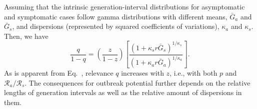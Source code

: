 \DIFaddbegin {}\DIFaddend Assuming that the intrinsic generation-interval distributions for asymptomatic and symptomatic cases follow gamma distributions with different means, $\bar G_a$ and  $\bar G_s$, and dispersions (represented by squared coefficients of variations), $\kappa_a$ and $\kappa_s$.
Then, we have
\begin{equation}
\frac{q}{1-q}=\left(\frac{z}{1-z}\right)\left[\frac{(1 + \kappa_s r \bar G_s)^{1/\kappa_s}}{(1 + \kappa_a r \bar G_a)^{1/\kappa_a}}\right].
\label{eq.gammaratio}
\end{equation}
As is apparent from Eq.~, relevance $q$ increases with $z$, i.e., with both $p$ and $\mathcal R_a/\mathcal R_s$. The consequences for outbreak potential further depends on the relative lengths of generation intervals as well as the relative amount of dispersions in them.
\DIFaddbegin {}\DIFaddend 

